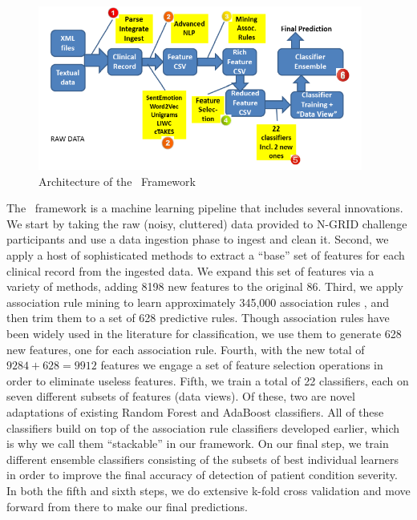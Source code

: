 \begin{figure}[h!t]
	\centering
	\includegraphics[width=0.95\textwidth]{figures/arch.png}
	\caption{Architecture of the \CREATE\ Framework}	
	\label{fig:arch}
\end{figure} 

The \CREATE\ framework is a machine learning pipeline that includes several innovations. We start by taking the raw (noisy, cluttered) data provided to N-GRID challenge participants and use a data ingestion phase to ingest and clean it.
Second, we apply a host of sophisticated methods to extract a ``base'' set of  features for each clinical record from the ingested data. We expand this set of features
via a variety of methods, adding  8198 new features to the original 86. 
Third, we apply association rule mining to learn approximately 345,000 association rules
\cite{fpgrowth,c5}, and then trim them to a set of 628 predictive rules. Though association rules have been widely used in the literature for classification, we use them to generate 628 new features, one for each association rule.
Fourth, with the new total of $9284+628=9912$ features we engage a set of 
feature selection operations in order to eliminate useless features. 
Fifth, we train a total of 22 classifiers, each on seven different subsets
of features (data views). Of these, two are novel adaptations of existing Random Forest \cite{ho95,breiman01} and AdaBoost \cite{adaboost} classifiers. 
All of these classifiers build on top of the association rule classifiers developed earlier,
which is why we call them ``stackable'' in our framework. On our final step, 
we train different ensemble classifiers consisting of the subsets of best 
individual learners in order to improve the final accuracy of detection of
patient condition severity. In both the fifth and sixth steps, we do extensive k-fold cross validation and move forward from there to make our final predictions.

